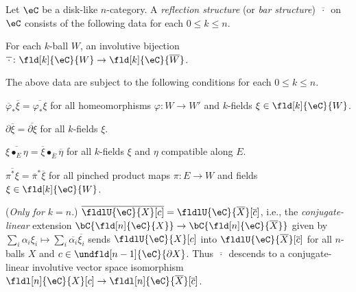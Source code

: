 \documentclass[12pt,reqno]{amsart}
\newcounter{alpha}\renewcommand\thealpha{\upshape\Alph{alpha}}
\newcommand{\C}{\eC}
\newcommand{\blt}{\bullet}
\newcommand{\fcj}[1]{\overline{#1}}
\newcommand{\orev}{\overline}
\newcommand{\defn}[1]{\emph{#1}}
\begin{document}
\begin{definition}
\label{def:reflection structure}
Let $\C$ be a disk-like $n$-category. A \defn{reflection structure} (or \defn{bar structure}) $\fcj{\,\cdot\,}$ on $\C$ consists of the following data for each $0\leq k\leq n$.
\begin{lst}
\item[(D$\fcj{\,\cdot\vphantom\eta\,}$)]\label{Drefl} For each $k$-ball $W$, an involutive bijection $\fcj{\,\cdot\,}\colon\fld[k]{\C}{W}\to\fld[k]{\C}{\orev{W}}$.
\end{lst}
The above data are subject to the following conditions for each $0\leq k\leq n$.
\begin{lst}

\item[(C$\fcj{\,\cdot\vphantom\eta\,}\varphi$)]
\label{axiom:refl-homeo}
$\orev{\varphi}_*\fcj{\xi} = \fcj{\varphi_*\xi}$ for all homeomorphisms $\varphi\colon W \to W'$ and $k$-fields $\xi\in\fld[k]{\C}{W}$.

\item[(C$\fcj{\,\cdot\vphantom\eta\,}\partial$)]
\label{axiom:refl-bdy} $\partial\fcj{\xi} = \fcj{\partial \xi}$ for all $k$-fields $\xi$.

\item[(C$\fcj{\,\cdot\vphantom\eta\,}$G)]
\label{axiom:refl-gluing}
$\fcj{\xi\blt_E\eta}=\fcj\xi\blt_{\orev{E}}\fcj\eta$ for all $k$-fields $\xi$ and $\eta$ compatible along $E$.

\item[(C$\fcj{\,\cdot\vphantom\eta\,}\pi$)]
\label{axiom:refl-products} $\fcj{\pi^*\xi}=\orev{\pi}^*\fcj{\xi}$ for all pinched product maps $\pi\colon E\to W$ and fields $\xi\in\fld[k]{\C}{W}$.

\item[(C$\fcj{\,\cdot\vphantom\eta\,}U$)]
\label{axiom:refl-local-relations}
(\emph{{Only for $k=n$}}.) 
$\fcj{\fldlU{\C}{X}[c]}=\fldlU{\C}{\orev X}[\fcj c]$, i.e., the \emph{conjugate-linear} extension $\bC\{\fld[n]{\C}{X}\}\to\bC\{\fld[n]{\C}{\orev{X}}\}$ given by $\sum_i\alpha_i\xi_i\mapsto\sum_i\fcj{\alpha_i}\fcj{\xi_i}$ sends $\fldlU{\C}{X}[c]$ into $\fldlU{\C}{\orev X}[\fcj c]$ for all $n$-balls $X$ and $c\in\undfld[n-1]{\C}{\partial X}$. Thus $\fcj{\,\cdot\,}$ descends to a conjugate-linear involutive vector space isomorphism $\fldl[n]{\C}{X}[ c] \to \fldl[n]{\C}{\orev{X}}[ \fcj{c}]$.
\end{lst}
\end{definition}
\end{document}
